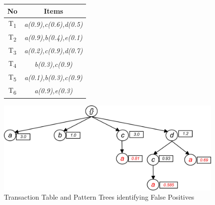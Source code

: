 \begin{figure}
\begin{minipage}{.4\textwidth}
  \centering
  
	\begin{center}
	\begin{tabular}{ |c|c| } 
 	\hline
 		No & Items \\ \hline\hline
 		T\textsubscript{1} & \emph{a(0.9),c(0.6),d(0.5)}\\ \hline
 		T\textsubscript{2}& \emph{a(0.9),b(0.4),e(0.1)}\\ \hline
 		T\textsubscript{3}& \emph{a(0.2),c(0.9),d(0.7)}\\ \hline
 		T\textsubscript{4}& \emph{b(0.3),c(0.9)}\\ \hline
 		T\textsubscript{5}& \emph{a(0.1),b(0.3),c(0.9)} \\ \hline
 		T\textsubscript{6} & \emph{a(0.9),e(0.3)
}\\ \hline
\end{tabular}
\end{center}  
\end{minipage}
\hfill
\begin{minipage}{0.50\textwidth}
  \centering
  \includegraphics[width=\textwidth]{images/frequent_tree_final.jpg}
\end{minipage}
\caption{Transaction Table and Pattern Trees identifying False Positives}
\label{figure:frequent_patterns_final}
\end{figure}
